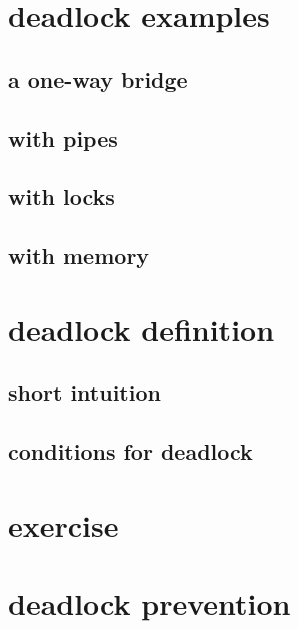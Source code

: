

\section{deadlock examples}

\subsection{a one-way bridge}


\subsection{with pipes}


\subsection{with locks}


\subsection{with memory}

 
\section{deadlock definition}

\subsection{short intuition}



\subsection{conditions for deadlock}



\section{exercise}



\section{deadlock prevention}

